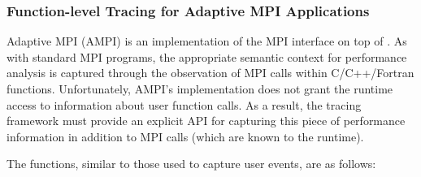 \documentclass[10pt]{article}
\begin{document}
\subsubsection{Function-level Tracing for Adaptive MPI Applications}
\label{sec::AMPI functions}

Adaptive MPI (AMPI) is an implementation of the MPI interface on top
of \charmpp{}. As with standard MPI programs, the appropriate semantic
context for performance analysis is captured through the observation
of MPI calls within C/C++/Fortran functions. Unfortunately, AMPI's
implementation does not grant the runtime access to information about
user function calls. As a result, the tracing framework must provide
an explicit API for capturing this piece of performance information in
addition to MPI calls (which are known to the runtime).

The functions, similar to those used to capture user events, are as
follows:
\end{document}
